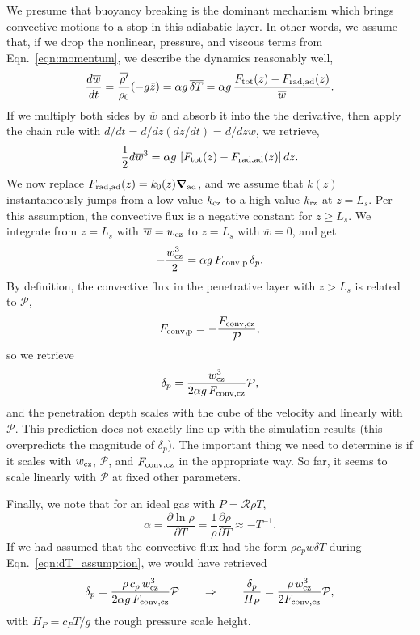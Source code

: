 \documentclass[12pt,preprint]{article}
\renewcommand{\vec}[1]{\boldsymbol{#1}}
\newcommand{\grad}{\vec{\nabla}}
\begin{document}
We presume that buoyancy breaking is the dominant mechanism which brings convective motions to a stop in this adiabatic layer.
In other words, we assume that, if we drop the nonlinear, pressure, and viscous terms from Eqn.~\ref{eqn:momentum}, we describe the dynamics reasonably well,
\begin{equation}
\frac{d \overline{w}}{dt} = \frac{\overline{\rho'}}{\rho_0}(-g\hat{z}) = \alpha g\, \overline{\delta T} = \alpha g \, \frac{F_{\rm{tot}}(z) - F_{\rm{rad, ad}}(z)}{\overline{w}}.
\end{equation}
If we multiply both sides by $\overline{w}$ and absorb it into the the derivative, then apply the chain rule with $d/dt = d/dz (dz/dt) = d/dz \overline{w}$, we retrieve,
\begin{equation}
\frac{1}{2} d\overline{w}^3 = \alpha g\, \left[F_{\rm{tot}}(z) - F_{\rm{rad, ad}}(z)\right]dz.
\end{equation}
We now replace $F_{\rm{rad, ad}}(z) = k_0(z) \grad_{\rm{ad}}$, and we assume that $k(z)$ instantaneously jumps from a low value $k_{\rm{cz}}$ to a high value $k_{\rm{rz}}$ at $z = L_s$.
Per this assumption, the convective flux is a negative constant for $z \geq L_s$.
We integrate from $z = L_s$ with $\overline{w} = w_{\rm{cz}}$ to $z = L_{s}$ with $\overline{w} = 0$, and get
\begin{equation}
-\frac{w_{\rm{cz}}^3}{2} = \alpha g\, F_{\rm{conv,p}}\,  \delta_p.
\end{equation}
By definition, the convective flux in the penetrative layer with $z > L_s$ is related to $\mathcal{P}$,
\begin{equation}
F_{\rm{conv,p}} = -\frac{F_{\rm{conv,cz}}}{\mathcal{P}},
\end{equation}
so we retrieve
\begin{equation}
\delta_p = \frac{w_{\rm{cz}}^3}{2\alpha g\, F_{\rm{conv, cz}}}  \mathcal{P},
\end{equation}
and the penetration depth scales with the cube of the velocity and linearly with $\mathcal{P}$.
This prediction does not exactly line up with the simulation results (this overpredicts the magnitude of $\delta_p$).
The important thing we need to determine is if it scales with $w_{\rm{cz}}$, $\mathcal{P}$, and $F_{\rm{conv,cz}}$ in the appropriate way.
So far, it seems to scale linearly with $\mathcal{P}$ at fixed other parameters.

Finally, we note that for an ideal gas with $P = \mathcal{R} \rho T$,
\begin{equation}
\alpha = \frac{\partial \ln\rho}{\partial T} = \frac{1}{\rho}\frac{\partial\rho}{\partial T} \approx - T^{-1}.
\end{equation}
If we had assumed that the convective flux had the form $\rho c_p w \delta T$ during Eqn.~\ref{eqn:dT_assumption}, we would have retrieved
\begin{equation}
\delta_p = \frac{\rho\, c_p\, w_{\rm{cz}}^3}{2\alpha g\, F_{\rm{conv, cz}}}  \mathcal{P}
\qquad \Rightarrow \qquad
\frac{\delta_p}{H_P} = \frac{\rho\, w_{\rm{cz}}^3}{2 F_{\rm{conv, cz}}}  \mathcal{P},
\end{equation}
with $H_P = c_P T / g$ the rough pressure scale height.



\end{document}
